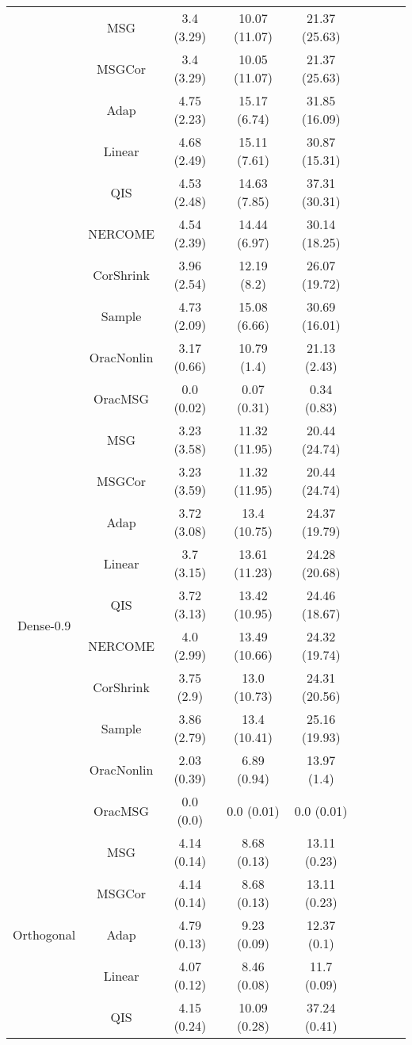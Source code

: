 \documentclass[useAMS,referee,usenatbib]{biom}
\begin{document}
\begin{table}[H]
{\begin{tabular}{ccccccccc}
 & MSG & 3.4 (3.29)  & 10.07 (11.07) & 21.37 (25.63) \\
 & MSGCor   & 3.4 (3.29)  & 10.05 (11.07) & 21.37 (25.63) \\
 & Adap     & 4.75 (2.23) & 15.17 (6.74)  & 31.85 (16.09) \\
 & Linear         & 4.68 (2.49) & 15.11 (7.61)  & 30.87 (15.31) \\
 & QIS            & 4.53 (2.48) & 14.63 (7.85)  & 37.31 (30.31) \\
 & NERCOME        & 4.54 (2.39) & 14.44 (6.97)  & 30.14 (18.25) \\
 & CorShrink      & 3.96 (2.54) & 12.19 (8.2)   & 26.07 (19.72) \\
 & Sample            & 4.73 (2.09) & 15.08 (6.66)  & 30.69 (16.01) \\
 & OracNonlin & 3.17 (0.66) & 10.79 (1.4)   & 21.13 (2.43)  \\
 & OracMSG  & 0.0 (0.02)  & 0.07 (0.31)   & 0.34 (0.83)   \\ \midrule
\multirow{10}{*}{Dense-0.9}  
 & MSG & 3.23 (3.58) & 11.32 (11.95) & 20.44 (24.74) \\
 & MSGCor   & 3.23 (3.59) & 11.32 (11.95) & 20.44 (24.74) \\
 & Adap     & 3.72 (3.08) & 13.4 (10.75)  & 24.37 (19.79) \\
 & Linear         & 3.7 (3.15)  & 13.61 (11.23) & 24.28 (20.68) \\
 & QIS            & 3.72 (3.13) & 13.42 (10.95) & 24.46 (18.67) \\
 & NERCOME        & 4.0 (2.99)  & 13.49 (10.66) & 24.32 (19.74) \\
 & CorShrink      & 3.75 (2.9)  & 13.0 (10.73)  & 24.31 (20.56) \\
 & Sample            & 3.86 (2.79) & 13.4 (10.41)  & 25.16 (19.93) \\
 & OracNonlin & 2.03 (0.39) & 6.89 (0.94)   & 13.97 (1.4)   \\
 & OracMSG  & 0.0 (0.0)   & 0.0 (0.01)    & 0.0 (0.01)   \\ \midrule
\multirow{10}{*}{Orthogonal}  
 & MSG & 4.14 (0.14) & 8.68 (0.13)  & 13.11 (0.23) \\
 & MSGCor   & 4.14 (0.14) & 8.68 (0.13)  & 13.11 (0.23) \\
 & Adap     & 4.79 (0.13) & 9.23 (0.09)  & 12.37 (0.1)  \\
 & Linear         & 4.07 (0.12) & 8.46 (0.08)  & 11.7 (0.09)  \\
 & QIS            & 4.15 (0.24) & 10.09 (0.28) & 37.24 (0.41) \\

\end{tabular}}
\end{table}
\end{document}
